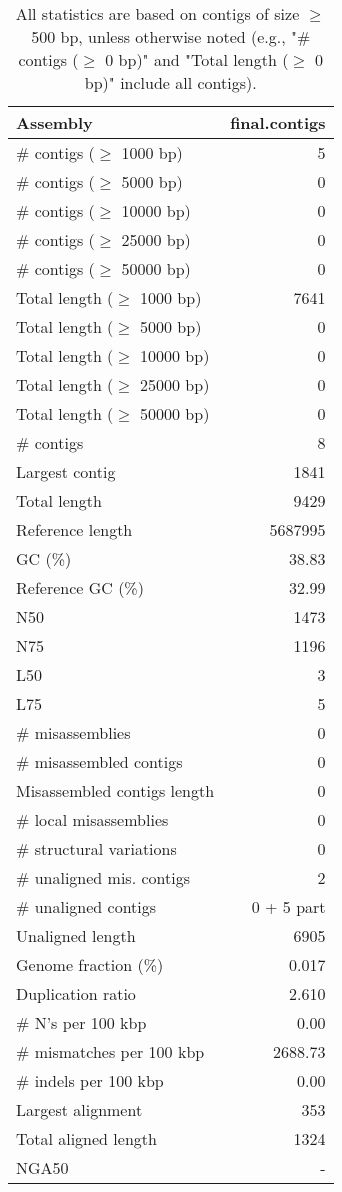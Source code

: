 \documentclass[12pt,a4paper]{article}
\begin{document}
\begin{table}[ht]
\begin{center}
\caption{All statistics are based on contigs of size $\geq$ 500 bp, unless otherwise noted (e.g., "\# contigs ($\geq$ 0 bp)" and "Total length ($\geq$ 0 bp)" include all contigs).}
\begin{tabular}{|l*{1}{|r}|}
\hline
Assembly & final.contigs \\ \hline
\# contigs ($\geq$ 1000 bp) & 5 \\ \hline
\# contigs ($\geq$ 5000 bp) & 0 \\ \hline
\# contigs ($\geq$ 10000 bp) & 0 \\ \hline
\# contigs ($\geq$ 25000 bp) & 0 \\ \hline
\# contigs ($\geq$ 50000 bp) & 0 \\ \hline
Total length ($\geq$ 1000 bp) & 7641 \\ \hline
Total length ($\geq$ 5000 bp) & 0 \\ \hline
Total length ($\geq$ 10000 bp) & 0 \\ \hline
Total length ($\geq$ 25000 bp) & 0 \\ \hline
Total length ($\geq$ 50000 bp) & 0 \\ \hline
\# contigs & 8 \\ \hline
Largest contig & 1841 \\ \hline
Total length & 9429 \\ \hline
Reference length & 5687995 \\ \hline
GC (\%) & 38.83 \\ \hline
Reference GC (\%) & 32.99 \\ \hline
N50 & 1473 \\ \hline
N75 & 1196 \\ \hline
L50 & 3 \\ \hline
L75 & 5 \\ \hline
\# misassemblies & 0 \\ \hline
\# misassembled contigs & 0 \\ \hline
Misassembled contigs length & 0 \\ \hline
\# local misassemblies & 0 \\ \hline
\# structural variations & 0 \\ \hline
\# unaligned mis. contigs & 2 \\ \hline
\# unaligned contigs & 0 + 5 part \\ \hline
Unaligned length & 6905 \\ \hline
Genome fraction (\%) & 0.017 \\ \hline
Duplication ratio & 2.610 \\ \hline
\# N's per 100 kbp & 0.00 \\ \hline
\# mismatches per 100 kbp & 2688.73 \\ \hline
\# indels per 100 kbp & 0.00 \\ \hline
Largest alignment & 353 \\ \hline
Total aligned length & 1324 \\ \hline
NGA50 & - \\ \hline
\end{tabular}
\end{center}
\end{table}
\end{document}

